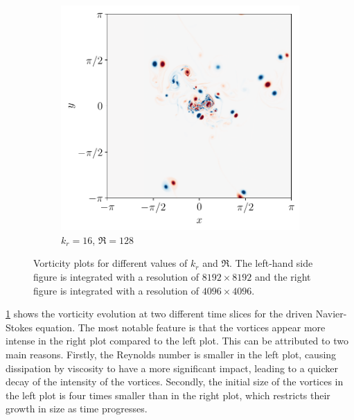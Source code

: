 \documentclass[../main.tex]{subfiles}
\begin{document}
\begin{figure}[ht]
\begin{subfigure}{0.44\textwidth}
		\includegraphics[width=\textwidth]{images/domainRe128kdn16.pdf}
		\caption{$k_r = 16$, $\Re = 128$}
	\end{subfigure}
	\caption{Vorticity plots for different values of $k_r$ and $\Re$. The left-hand side figure is integrated with a resolution of $8192\times 8192$ and the right figure is integrated with a resolution of $4096\times 4096$.}\label{fig:vortices_evo}
\end{figure}

\cref{fig:vortices_evo} shows the vorticity evolution at two different time slices for the driven Navier-Stokes equation. The most notable feature is that the vortices appear more intense in the right plot compared to the left plot. This can be attributed to two main reasons. Firstly, the Reynolds number is smaller in the left plot, causing dissipation by viscosity to have a more significant impact, leading to a quicker decay of the intensity of the vortices. Secondly, the initial size of the vortices in the left plot is four times smaller than in the right plot, which restricts their growth in size as time progresses.
\end{document}
